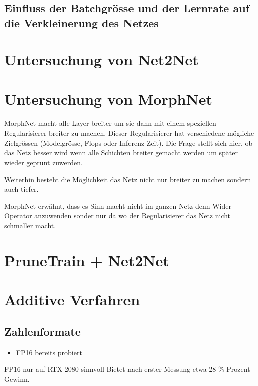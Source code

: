 \subsection{Einfluss der Batchgrösse und der Lernrate auf die Verkleinerung des Netzes}



\section{Untersuchung von Net2Net}


\section{Untersuchung von MorphNet}

MorphNet macht alle Layer breiter um sie dann mit einem speziellen Regularisierer breiter zu machen. Dieser Regularisierer hat verschiedene mögliche Zielgrössen (Modelgrösse, Flops oder Inferenz-Zeit).
Die Frage stellt sich hier, ob das Netz besser wird wenn alle Schichten breiter gemacht werden um später wieder geprunt zuwerden.

Weiterhin besteht die Möglichkeit das Netz nicht nur breiter zu machen sondern auch tiefer.


MorphNet erwähnt, dass es Sinn macht nicht im ganzen Netz denn Wider Operator anzuwenden sonder nur da wo der Regularisierer das Netz nicht schmaller macht.
\section{PruneTrain + Net2Net}

\section{Additive Verfahren}

\subsection{Zahlenformate}

\begin{itemize}
 \item FP16 bereits probiert
\end{itemize}


FP16 nur auf RTX 2080 sinnvoll
Bietet nach erster Messung etwa 28 \% Prozent Gewinn.

